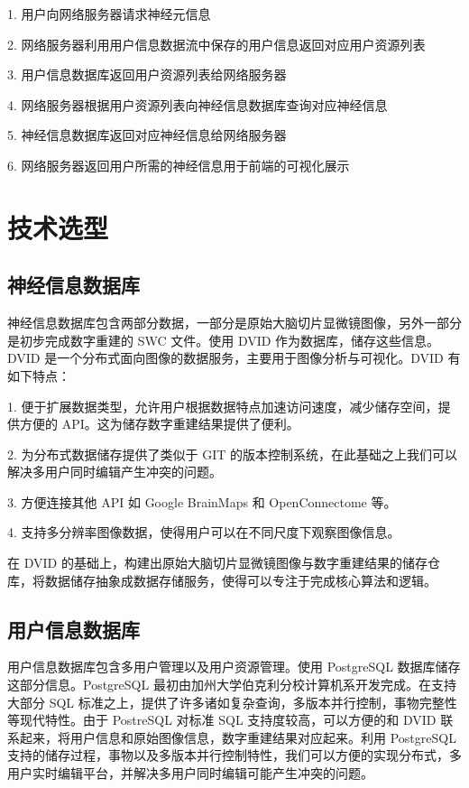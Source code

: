 1. 用户向网络服务器请求神经元信息

2. 网络服务器利用用户信息数据流中保存的用户信息返回对应用户资源列表

3. 用户信息数据库返回用户资源列表给网络服务器

4. 网络服务器根据用户资源列表向神经信息数据库查询对应神经信息

5. 神经信息数据库返回对应神经信息给网络服务器

6. 网络服务器返回用户所需的神经信息用于前端的可视化展示

\section{技术选型}

\subsection{神经信息数据库}
神经信息数据库包含两部分数据，一部分是原始大脑切片显微镜图像，另外一部分是初步完成数字重建的 SWC 文件。使用 DVID 作为数据库，储存这些信息。DVID 是一个分布式面向图像的数据服务，主要用于图像分析与可视化。DVID 有如下特点：

1. 便于扩展数据类型，允许用户根据数据特点加速访问速度，减少储存空间，提供方便的 API。这为储存数字重建结果提供了便利。

2. 为分布式数据储存提供了类似于 GIT 的版本控制系统，在此基础之上我们可以解决多用户同时编辑产生冲突的问题。

3. 方便连接其他 API 如 Google BrainMaps 和 OpenConnectome 等。

4. 支持多分辨率图像数据，使得用户可以在不同尺度下观察图像信息。

在 DVID 的基础上，构建出原始大脑切片显微镜图像与数字重建结果的储存仓库，将数据储存抽象成数据存储服务，使得可以专注于完成核心算法和逻辑。


\subsection{用户信息数据库}
用户信息数据库包含多用户管理以及用户资源管理。使用 PostgreSQL 数据库储存这部分信息。PostgreSQL 最初由加州大学伯克利分校计算机系开发完成。在支持大部分 SQL 标准之上，提供了许多诸如复杂查询，多版本并行控制，事物完整性等现代特性。由于 PostreSQL 对标准 SQL 支持度较高，可以方便的和 DVID 联系起来，将用户信息和原始图像信息，数字重建结果对应起来。利用 PostgreSQL 支持的储存过程，事物以及多版本并行控制特性，我们可以方便的实现分布式，多用户实时编辑平台，并解决多用户同时编辑可能产生冲突的问题。

